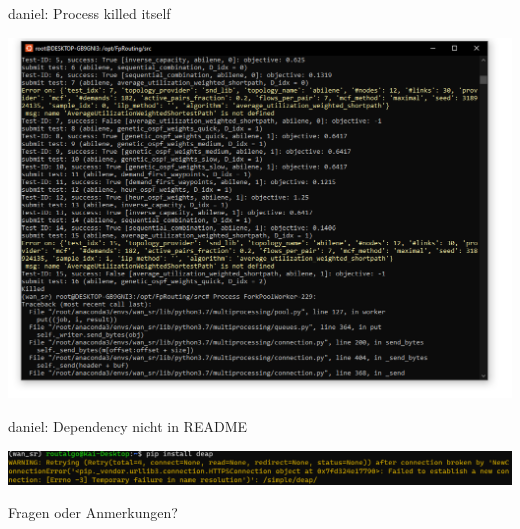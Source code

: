 \documentclass[aspectratio=169,10pt]{beamer}
\begin{document}
\begin{frame}{daniel: Process killed itself}
\begin{center}
    \includegraphics[width=\textwidth]{images/err2.png}
\end{center}
\end{frame}
\begin{frame}{daniel: Dependency nicht in README}
\begin{center}
    \includegraphics[width=\textwidth]{images/err4.png}
\end{center}
\end{frame}

\begin{frame}[t,standout]
\Large
Fragen oder Anmerkungen?
\end{frame}
\end{document}
